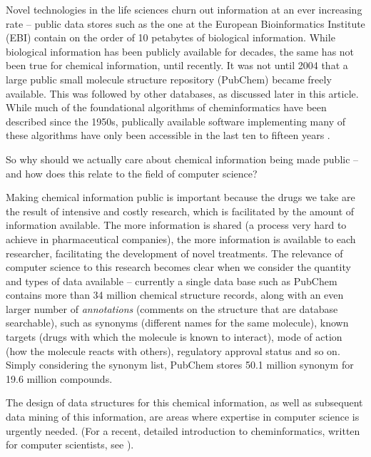 \documentclass{sig-alternate}
\begin{document}
Novel technologies in the life sciences churn out information at an
ever increasing rate -- public data stores such as the one at the
European Bioinformatics Institute (EBI) contain on the order of 10
petabytes of biological information.  While biological information has
been publicly available for decades, the same has not been true for
chemical information, until recently. It was not until 2004 that a
large public small molecule structure repository (PubChem) became
freely available. This was followed by other databases, as discussed
later in this article. While much of the foundational algorithms of
cheminformatics have been described since the 1950s, publically
available software implementing many of these algorithms have only
been accessible in the last ten to fifteen years \cite{faulon2010}.

So why should we actually care about chemical information being made
public -- and how does this relate to the field of computer science?

Making chemical information public is important because the drugs we
take are the result of intensive and costly research, which is
facilitated by the amount of information available. The more
information is shared (a process very hard to achieve in
pharmaceutical companies), the more information is available to each
researcher, facilitating the development of novel treatments. The
relevance of computer science to this research becomes clear when we
consider the quantity and types of data available -- currently a
single data base such as PubChem contains more than 34 million
chemical structure records, along with an even larger number of
\emph{annotations} (comments on the structure that are database searchable), such as synonyms (different names for the same molecule), known targets (drugs with which the molecule is known to interact), mode of action (how the molecule reacts with others),
regulatory approval status and so on.  Simply considering the synonym
list, PubChem stores 50.1 million synonym for 19.6 million compounds.

The design of data structures for this chemical information, as well
as subsequent data mining of this information, are areas where
expertise in computer science is urgently needed. (For a recent,
detailed introduction to cheminformatics, written for computer
scientists, see \cite{brown2009}).
\end{document}
